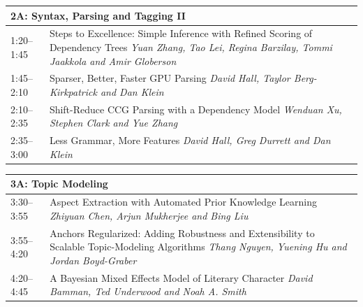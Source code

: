 \documentclass[twoside,makeidx]{book}
\renewcommand{\large}{\fontsize{36}{40}\selectfont}
\begin{document}
\vspace{0.5in}
\begin{tabular}{p{3in}p{12in}}
  \multicolumn{2}{l}{\bfseries\large 2A: Syntax, Parsing and Tagging II} \\\hline
  1:20--1:45
	& Steps to Excellence: Simple Inference with Refined Scoring of Dependency Trees \newline
  \itshape Yuan Zhang, Tao Lei, Regina Barzilay, Tommi Jaakkola and Amir Globerson \\

  1:45--2:10
	& Sparser, Better, Faster GPU Parsing \newline
  \itshape David Hall, Taylor Berg-Kirkpatrick and Dan Klein \\

  2:10--2:35
	& Shift-Reduce CCG Parsing with a Dependency Model \newline
  \itshape Wenduan Xu, Stephen Clark and Yue Zhang \\

  2:35--3:00
	& Less Grammar, More Features \newline
  \itshape David Hall, Greg Durrett and Dan Klein
\end{tabular}

\vspace{0.5in}
\begin{tabular}{p{3in}p{12in}}
  \multicolumn{2}{l}{\bfseries\large 3A: Topic Modeling} \\\hline

  3:30--3:55
	& Aspect Extraction with Automated Prior Knowledge Learning \newline
  \itshape Zhiyuan Chen, Arjun Mukherjee and Bing Liu \\

  3:55--4:20
	& Anchors Regularized: Adding Robustness and Extensibility to Scalable Topic-Modeling Algorithms \newline
  \itshape Thang Nguyen, Yuening Hu and Jordan Boyd-Graber \\

  4:20--4:45
	& A Bayesian Mixed Effects Model of Literary Character \newline
  \itshape David Bamman, Ted Underwood and Noah A. Smith \\
\end{tabular}
\end{document}
